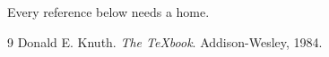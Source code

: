 \documentclass{article}
\begin{document}
Every reference below needs a home.

\begin{thebibliography}{9}
Donald E. Knuth. \textit{The \TeX{}book}. Addison-Wesley, 1984.
\end{thebibliography}
\end{document}
